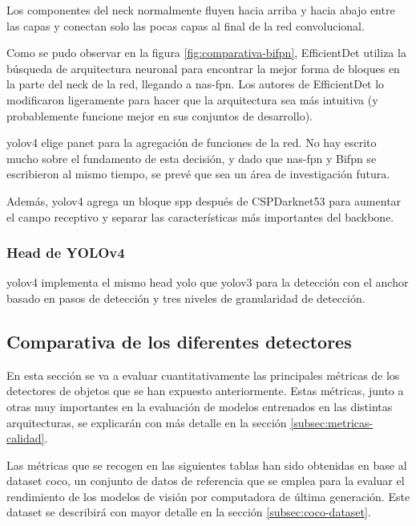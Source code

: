 Los componentes del neck normalmente fluyen hacia arriba y hacia abajo entre las capas y conectan solo las pocas capas al final de la red convolucional.

Como se pudo observar en la figura \ref{fig:comparativa-bifpn}, EfficientDet utiliza la búsqueda de arquitectura neuronal para encontrar la mejor forma de bloques en la parte del neck de la red, llegando a \gls{nas}-\gls{fpn}. Los autores de EfficientDet lo modificaron ligeramente para hacer que la arquitectura sea más intuitiva (y probablemente funcione mejor en sus conjuntos de desarrollo).

\gls{yolov4} elige \gls{pan}et para la agregación de funciones de la red. No hay escrito mucho sobre el fundamento de esta decisión, y dado que \gls{nas}-\gls{fpn} y Bi\gls{fpn} se escribieron al mismo tiempo, se prevé que sea un área de investigación futura.

Además, \gls{yolov4} agrega un bloque \gls{spp} después de CSPDarknet53 para aumentar el campo receptivo y separar las características más importantes del backbone.

\subsubsection*{Head de YOLOv4}
\label{subsubsec:yolov4-head}

\gls{yolov4} implementa el mismo head \gls{yolo} que \gls{yolo}v3 \cite{redmon2018yolov3} para la detección con el anchor basado en pasos de detección y tres niveles de granularidad de detección.

\subsection{Comparativa de los diferentes detectores}
\label{subsec:comparativa-detectores}

En esta sección se va a evaluar cuantitativamente las principales métricas de los detectores de objetos que se han expuesto anteriormente. Estas métricas, junto a otras muy importantes en la evaluación de modelos entrenados en las distintas arquitecturas, se explicarán con más detalle en la sección \ref{subsec:metricas-calidad}.

Las métricas que se recogen en las siguientes tablas han sido obtenidas en base al dataset \gls{coco}, un conjunto de datos de referencia que se emplea para la evaluar el rendimiento de los modelos de visión por computadora de última generación. Este dataset se describirá con mayor detalle en la sección \ref{subsec:coco-dataset}.

